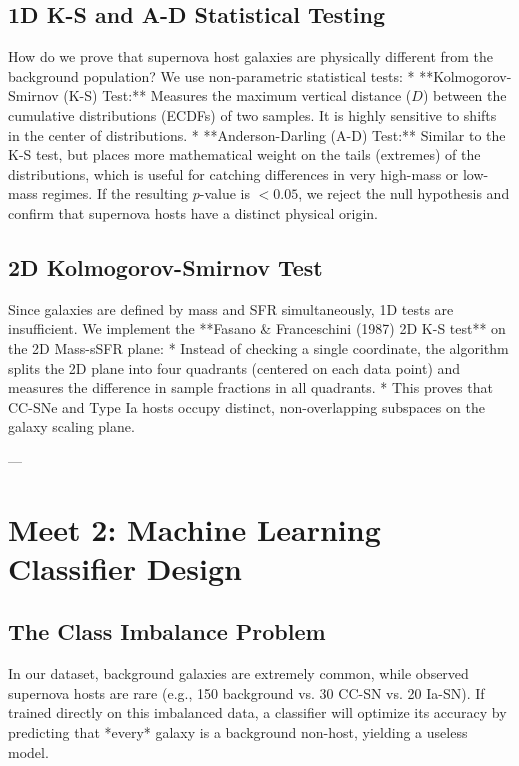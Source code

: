 \documentclass[11pt,a4paper]{article}
\begin{document}
\subsection{1D K-S and A-D Statistical Testing}
How do we prove that supernova host galaxies are physically different from the background population? We use non-parametric statistical tests:
*   **Kolmogorov-Smirnov (K-S) Test:** Measures the maximum vertical distance ($D$) between the cumulative distributions (ECDFs) of two samples. It is highly sensitive to shifts in the center of distributions.
*   **Anderson-Darling (A-D) Test:** Similar to the K-S test, but places more mathematical weight on the tails (extremes) of the distributions, which is useful for catching differences in very high-mass or low-mass regimes.
If the resulting $p$-value is $< 0.05$, we reject the null hypothesis and confirm that supernova hosts have a distinct physical origin.

\subsection{2D Kolmogorov-Smirnov Test}
Since galaxies are defined by mass and SFR simultaneously, 1D tests are insufficient. We implement the **Fasano \& Franceschini (1987) 2D K-S test** on the 2D Mass-sSFR plane:
*   Instead of checking a single coordinate, the algorithm splits the 2D plane into four quadrants (centered on each data point) and measures the difference in sample fractions in all quadrants.
*   This proves that CC-SNe and Type Ia hosts occupy distinct, non-overlapping subspaces on the galaxy scaling plane.

---

\section{Meet 2: Machine Learning Classifier Design}

\subsection{The Class Imbalance Problem}
In our dataset, background galaxies are extremely common, while observed supernova hosts are rare (e.g., 150 background vs. 30 CC-SN vs. 20 Ia-SN). If trained directly on this imbalanced data, a classifier will optimize its accuracy by predicting that *every* galaxy is a background non-host, yielding a useless model.
\end{document}
